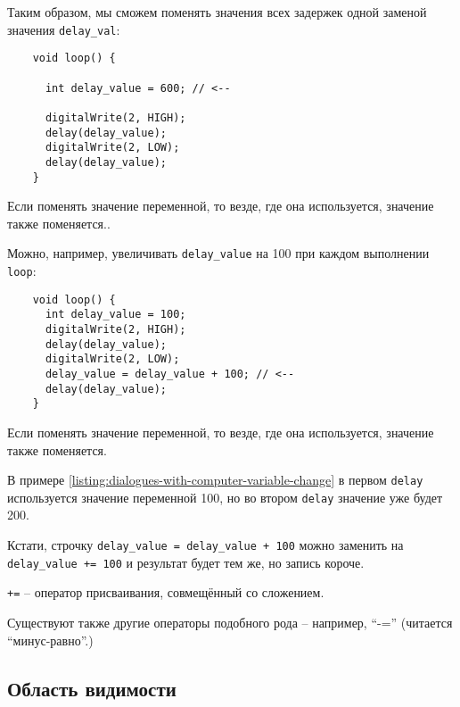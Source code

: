 \documentclass[../sparc.tex]{subfiles}
\begin{document}
Таким образом, мы сможем поменять значения всех задержек одной заменой значения
\texttt{delay\_val}:

\begin{listing}[ht]
  \begin{verbatim}
    void loop() {

      int delay_value = 600; // <--

      digitalWrite(2, HIGH);
      delay(delay_value);
      digitalWrite(2, LOW);
      delay(delay_value);
    }
  \end{verbatim}
  \label{listing:dialogues-with-computer-variable-set-value}
  \caption{Если поменять значение переменной, то везде, где она используется,
    значение также поменяется..}
\end{listing}

Можно, например, увеличивать \texttt{delay\_value} на 100 при каждом выполнении
\texttt{loop}:

\begin{listing}[ht]
  \begin{verbatim}
    void loop() {
      int delay_value = 100;
      digitalWrite(2, HIGH);
      delay(delay_value);
      digitalWrite(2, LOW);
      delay_value = delay_value + 100; // <--
      delay(delay_value);
    }
  \end{verbatim}
  \label{listing:dialogues-with-computer-variable-change}
  \caption{Если поменять значение переменной, то везде, где она используется,
    значение также поменяется.}
\end{listing}

В примере \ref{listing:dialogues-with-computer-variable-change} в первом
\texttt{delay} используется значение переменной 100, но во втором \texttt{delay}
значение уже будет 200.

Кстати, строчку \texttt{delay\_value = delay\_value + 100} можно заменить на
\texttt{delay\_value += 100} и результат будет тем же, но запись короче.

\texttt{+=} -- оператор присваивания, совмещённый со сложением.

Существуют также другие операторы подобного рода -- например, ``-='' (читается
``минус-равно''.)

\subsection{Область видимости}
\end{document}
